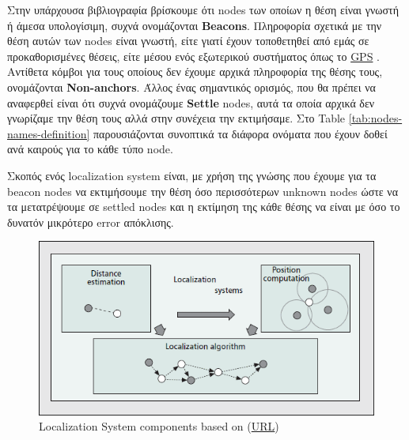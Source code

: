 Στην υπάρχουσα βιβλιογραφία \cite{farooqiazam2016location} \cite{wsn-Localization-systems} \cite{wsn-Localization-techniques} βρίσκουμε ότι
nodes των οποίων η θέση είναι γνωστή ή άμεσα υπολογίσιμη, συχνά ονομάζονται \textbf{Beacons}. Πληροφορία σχετικά με την θέση αυτών
των nodes είναι γνωστή, είτε γιατί έχουν τοποθετηθεί από εμάς σε προκαθορισμένες θέσεις, είτε μέσου ενός εξωτερικού συστήματος
όπως το \hyperref[abbr:GPS]{GPS} \cite{angle-of-arrival}.
Αντίθετα κόμβοι για τους οποίους δεν έχουμε αρχικά πληροφορία της θέσης τους, ονομάζονται \textbf{Non-anchors}.
Άλλος ένας σημαντικός ορισμός, που θα πρέπει να αναφερθεί είναι ότι συχνά ονομάζουμε \textbf{Settle} nodes, 
αυτά τα οποία αρχικά δεν γνωρίζαμε την θέση τους αλλά στην συνέχεια την εκτιμήσαμε.
Στο Table \ref{tab:nodes-names-definition} παρουσιάζονται συνοπτικά τα διάφορα ονόματα που έχουν δοθεί ανά 
καιρούς για το κάθε τύπο node.

Σκοπός ενός localization system είναι, με χρήση της γνώσης που έχουμε για τα beacon nodes να εκτιμήσουμε
την θέση όσο περισσότερων unknown nodes ώστε να τα μετατρέψουμε σε settled nodes και η εκτίμηση της κάθε
θέσης να είναι με όσο το δυνατόν μικρότερο error απόκλισης. 

\begin{figure} [H]
	\centering
	\includegraphics[scale=0.5]{Images/Theoretical-Background/localization-systems-components.png}
	\decoRule
	\caption[Localization System components]{Localization System components based on \cite{wsn-Localization-systems} (\href{https://ieeexplore.ieee.org/document/4407221}{URL})}
	\label{fig:Localization-Systems-components}
\end{figure}

